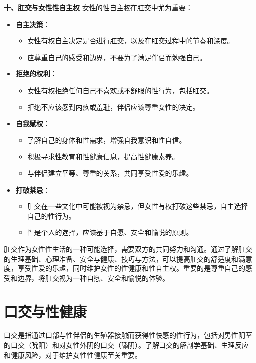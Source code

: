 \documentclass[12pt,UTF8]{ctexbook}
\begin{document}
\textbf{十、肛交与女性性自主权}
女性的性自主权在肛交中尤为重要：

\begin{itemize}
	\item \textbf{自主决策}：
	\begin{itemize}
		\item 女性有权自主决定是否进行肛交，以及在肛交过程中的节奏和深度。
		\item 应尊重自己的感受和边界，不要为了满足伴侣而勉强自己。
	\end{itemize}
	\item \textbf{拒绝的权利}：
	\begin{itemize}
		\item 女性有权拒绝任何自己不喜欢或不舒服的性行为，包括肛交。
		\item 拒绝不应该感到内疚或羞耻，伴侣应该尊重女性的决定。
	\end{itemize}
	\item \textbf{自我赋权}：
	\begin{itemize}
		\item 了解自己的身体和性需求，增强自我意识和性自信。
		\item 积极寻求性教育和性健康信息，提高性健康素养。
		\item 与伴侣建立平等、尊重的关系，共同享受性爱的乐趣。
	\end{itemize}
	\item \textbf{打破禁忌}：
	\begin{itemize}
		\item 肛交在一些文化中可能被视为禁忌，但女性有权打破这些禁忌，自主选择自己的性行为。
		\item 性是个人的选择，应该基于自愿、安全和愉悦的原则。
	\end{itemize}
\end{itemize}

肛交作为女性性生活的一种可能选择，需要双方的共同努力和沟通。通过了解肛交的生理基础、心理准备、安全与健康、技巧与方法，可以提高肛交的舒适度和满意度，享受性爱的乐趣，同时维护女性的性健康和性自主权。重要的是尊重自己的感受和边界，将肛交视为一种自愿、安全和愉悦的体验。

\chapter{口交与性健康}

口交是指通过口部与性伴侣的生殖器接触而获得性快感的性行为，包括对男性阴茎的口交（吮阳）和对女性外阴的口交（舔阴）。了解口交的解剖学基础、生理反应和健康风险，对于维护女性性健康至关重要。
\end{document}

